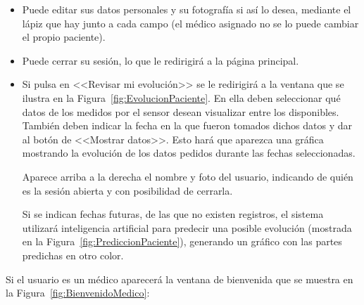 \begin{itemize}
    \item Puede editar sus datos personales y su fotografía si así lo desea, mediante el lápiz que hay junto a cada campo (el médico asignado no se lo puede cambiar el propio paciente). 
    \item Puede cerrar su sesión, lo que le redirigirá a la página principal. 
    \item Si pulsa en <<Revisar mi evolución>> se le redirigirá a la ventana que se ilustra en la Figura~\ref{fig:EvolucionPaciente}.
    En ella deben seleccionar qué datos de los medidos por el sensor desean visualizar entre los disponibles. También deben indicar la fecha en la que fueron tomados dichos datos y dar al botón de <<Mostrar datos>>. Esto hará que aparezca una gráfica mostrando la evolución de los datos pedidos durante las fechas seleccionadas.
    
    Aparece arriba a la derecha el nombre y foto del usuario, indicando de quién es la sesión abierta y con posibilidad de cerrarla.
    
    Si se indican fechas futuras, de las que no existen registros, el sistema utilizará inteligencia artificial para predecir una posible evolución (mostrada en la Figura~\ref{fig:PrediccionPaciente}), generando un gráfico con las partes predichas en otro color.
\end{itemize}


Si el usuario es un médico aparecerá la ventana de bienvenida que se muestra en la Figura~\ref{fig:BienvenidoMedico}: 

